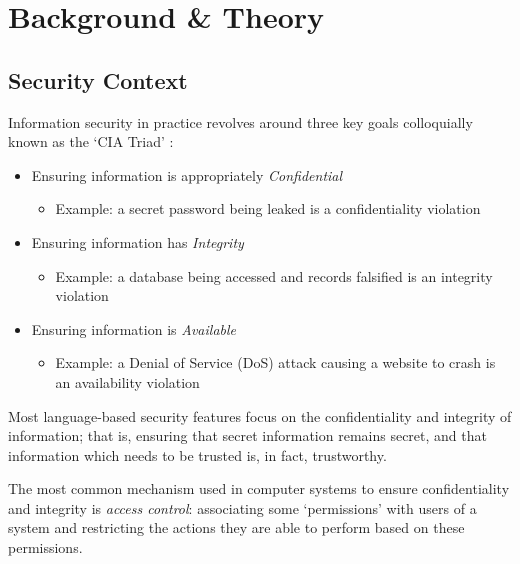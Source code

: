 \chapter{Background \& Theory} \label{chap_theory}

\section{Security Context}

Information security in practice revolves around three key goals colloquially known as the `CIA Triad' \cite{krutz2010cloudsec}:

\begin{itemize}
	\item Ensuring information is appropriately \textit{Confidential}

	\begin{itemize}
		\item Example: a secret password being leaked is a confidentiality violation
	\end{itemize}
	
	\item Ensuring information has \textit{Integrity}
	
	\begin{itemize}
		\item Example: a database being accessed and records falsified is an integrity violation
	\end{itemize}
	
	\item Ensuring information is \textit{Available}
	
	\begin{itemize}
		\item Example: a Denial of Service (DoS) attack causing a website to crash is an availability violation
	\end{itemize}

\end{itemize}

Most language-based security features focus on the confidentiality and integrity of information; that is, ensuring that secret information remains secret, and that information which needs to be trusted is, in fact, trustworthy.

The most common mechanism used in computer systems to ensure confidentiality and integrity is \textit{access control}: associating some `permissions' with users of a system and restricting the actions they are able to perform based on these permissions.

